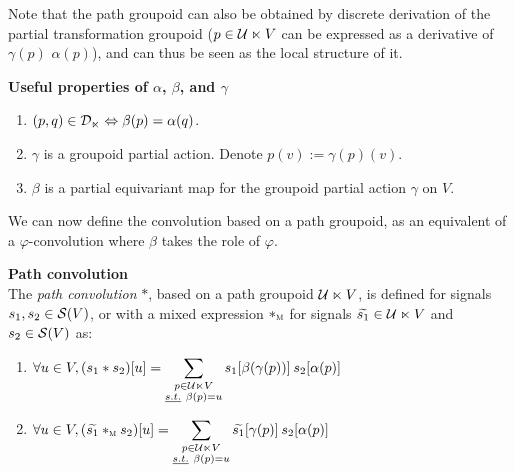 
\begin{remark}Note that the path groupoid can also be obtained by discrete derivation of the partial transformation groupoid (\ie $p \in \cu \ltimes V$ can be expressed as a derivative of $\gamma(p)$ \wrt $\alpha(p)$), and can thus be seen as the local structure of it.
\end{remark}

\begin{lemma}\textbf{Useful properties of $\alpha$, $\beta$, and $\gamma$}%
\begin{enumerate}
  \item $(p,q) \in \cdl \Leftrightarrow \beta(p) = \alpha(q)$.
  \item $\gamma$ is a groupoid partial action. Denote $p(v) := \gamma(p)(v)$.%
  \item $\beta$ is a partial equivariant map for the groupoid partial action $\gamma$ on $V$.
\end{enumerate}
\end{lemma}

We can now define the convolution based on a path groupoid, as an equivalent of a $\varphi$-convolution where $\beta$ takes the role of $\varphi$.

\begin{definition}\textbf{Path convolution}\\
The \emph{path convolution} $\ast$, based on a path groupoid $\cu \ltimes V$, is defined for signals $s_1, s_2 \in \cs(V)$, or with a mixed expression $\ast_{\M}$ for signals $\widetilde{s_1} \in \cu \ltimes V$ and $s_2 \in \cs(V)$ as:
\begin{enumerate}[label=(\roman*)]
\item $\forall u \in V, (s_1 \ast s_2) [u] = \displaystyle\sum_{\substack{p \in \cu \ltimes V\\ \st \beta(p)=u}} s_1[\beta(\gamma(p))] \h{2} s_2[\alpha(p)]$
\item $\forall u \in V, (\widetilde{s_1} \ast_{\M} s_2) [u] = \displaystyle\sum_{\substack{p \in \cu \ltimes V\\ \st \beta(p)=u}} \widetilde{s_1}[\gamma(p)] \h{2} s_2[\alpha(p)]$
\end{enumerate}
\end{definition}

